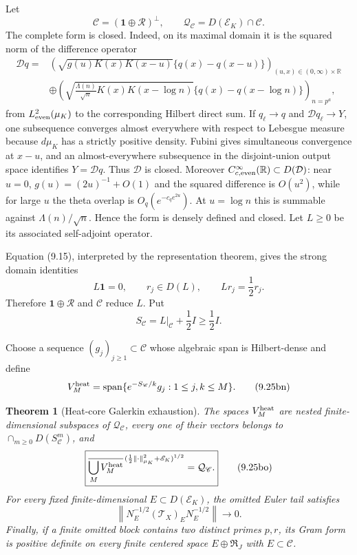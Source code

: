 \documentclass[11pt]{amsart}
\newtheorem{theorem}{Theorem}[section]
\theoremstyle{definition}
\theoremstyle{remark}
\begin{document}
Let
\[
 \mathscr C=(\mathbf1\oplus\mathcal R)^\perp,
 \qquad
 \mathcal Q_{\mathscr C}=D(\mathscr E_K)\cap\mathscr C.
\tag{9.25bj}
\]
The complete form is closed.  Indeed, on its maximal domain it is the
squared norm of the difference operator
\[
\begin{aligned}
 \mathcal Dq={}&
 \left(
 \sqrt{g(u)K(x)K(x-u)}\{q(x)-q(x-u)\}
 \right)_{(u,x)\in(0,\infty)\times\mathbb R}
 \\
 &\oplus
 \left(
 \sqrt{\frac{\Lambda(n)}{\sqrt n}K(x)K(x-\log n)}
 \{q(x)-q(x-\log n)\}
 \right)_{n=p^a},
\end{aligned}
\tag{9.25bk}
\]
from \(L^2_{\rm even}(\mu_K)\) to the corresponding Hilbert direct sum.
If \(q_\ell\to q\) and \(\mathcal Dq_\ell\to Y\), one subsequence converges
almost everywhere with respect to Lebesgue measure because \(d\mu_K\) has
a strictly positive density.  Fubini gives simultaneous convergence at
\(x-u\), and an almost-everywhere subsequence in the disjoint-union output
space identifies \(Y=\mathcal Dq\).  Thus \(\mathcal D\) is closed.
Moreover \(C_{c,\rm even}^\infty(\mathbb R)\subset D(\mathcal D)\): near
\(u=0\), \(g(u)=(2u)^{-1}+O(1)\) and the squared difference is \(O(u^2)\),
while for large \(u\) the theta overlap is \(O_q(e^{-c_qe^{2u}})\).
At \(u=\log n\) this is summable against
\(\Lambda(n)/\sqrt n\).  Hence the form is densely defined and closed.
Let \(L\ge0\) be its associated self-adjoint operator.

Equation (9.15), interpreted by the representation theorem, gives the
strong domain identities
\[
 L\mathbf1=0,
 \qquad
 r_j\in D(L),\qquad Lr_j=\frac12r_j.
\tag{9.25bl}
\]
Therefore \(\mathbf1\oplus\mathcal R\) and \(\mathscr C\) reduce \(L\).
Put
\[
 S_{\mathscr C}=L|_{\mathscr C}+\frac12I\ge\frac12I.
\tag{9.25bm}
\]

Choose a sequence \((g_j)_{j\ge1}\subset\mathscr C\) whose algebraic span
is Hilbert-dense and define
\[
 V_M^{\rm heat}
 =\operatorname{span}\{e^{-S_{\mathscr C}/k}g_j:1\le j,k\le M\}.
\tag{9.25bn}
\]

\begin{theorem}[Heat-core Galerkin exhaustion]
\label{thm:heat-core}
The spaces \(V_M^{\rm heat}\) are nested finite-dimensional subspaces of
\(\mathcal Q_{\mathscr C}\), every one of their vectors belongs to
\(\cap_{m\ge0}D(S_{\mathscr C}^m)\), and
\[
 \boxed{
 \overline{\bigcup_MV_M^{\rm heat}}^{\,
 (\frac12\|\cdot\|_{\mu_K}^2+\mathscr E_K)^{1/2}}
 =\mathcal Q_{\mathscr C}.}
\tag{9.25bo}
\]
For every fixed finite-dimensional
\(E\subset D(\mathscr E_K)\), the omitted Euler tail satisfies
\[
 \boxed{
 \left\|N_E^{-1/2}(\mathcal T_X)_EN_E^{-1/2}\right\|
 \longrightarrow0.}
\tag{9.25bp}
\]
Finally, if a finite omitted block contains two distinct primes \(p,r\),
its Gram form is positive definite on every finite centered space
\(E\oplus\mathfrak R_J\) with \(E\subset\mathscr C\).
\end{theorem}
\end{document}
